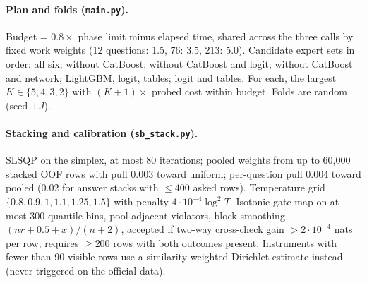 \paragraph{Plan and folds (\texttt{main.py}).} Budget = $0.8\times$ phase limit minus elapsed time, shared across the three calls by fixed work weights (12 questions: 1.5, 76: 3.5, 213: 5.0). Candidate expert sets in order: all six; without CatBoost; without CatBoost and logit; without CatBoost and network; LightGBM, logit, tables; logit and tables. For each, the largest $K\in\{5,4,3,2\}$ with $(K+1)\times$ probed cost within budget. Folds are random (seed $+J$).

\paragraph{Stacking and calibration (\texttt{sb\_stack.py}).} SLSQP on the simplex, at most 80 iterations; pooled weights from up to 60,000 stacked OOF rows with pull 0.003 toward uniform; per-question pull 0.004 toward pooled (0.02 for answer stacks with $\le 400$ asked rows). Temperature grid $\{0.8,0.9,1,1.1,1.25,1.5\}$ with penalty $4\cdot 10^{-4}\log^2 T$. Isotonic gate map on at most 300 quantile bins, pool-adjacent-violators, block smoothing $(nr+0.5+x)/(n+2)$, accepted if two-way cross-check gain $>2\cdot10^{-4}$ nats per row; requires $\ge 200$ rows with both outcomes present. Instruments with fewer than 90 visible rows use a similarity-weighted Dirichlet estimate instead (never triggered on the official data).
